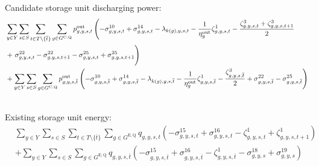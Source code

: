 \documentclass{article}
\newcommand{\sStorageExisting}{G^{\mathrm{E,Q}}}
\newcommand{\sStorageCandidate}{G^{\mathrm{C,Q}}}
\newcommand{\sYears}{Y}
\newcommand{\sScenarios}{S}
\newcommand{\sIntervals}{T}
\newcommand{\iGenerator}{g}
\newcommand{\iYear}{y}
\newcommand{\iScenario}{s}
\newcommand{\iInterval}{t}
\newcommand{\iIntervalTerminal}{\overline{\iInterval}}
\newcommand{\iZone}{z}
\newcommand{\cStorageUnitEfficiencyDischarging}{\eta_{\iGenerator}^{\mathrm{out}}}
\newcommand{\vPowerOut}[1][\iGenerator,\iYear,\iScenario,\iInterval]{p^{\mathrm{out}}_{#1}}
\newcommand{\vStorageUnitEnergy}[1][\iGenerator,\iYear,\iScenario,\iInterval]{q_{#1}}
\newcommand{\dNonNegativeDischarging}[1][\iGenerator,\iYear,\iScenario,\iInterval]{\sigma_{#1}^{10}}
\newcommand{\dMaxDischargingRateCandidate}[1][\iGenerator,\iYear,\iScenario,\iInterval]{\sigma_{#1}^{14}}
\newcommand{\dNonNegativeStorageEnergy}[1][\iGenerator,\iYear,\iScenario,\iInterval]{\sigma_{#1}^{15}}
\newcommand{\dMaxStorageEnergyExisting}[1][\iGenerator,\iYear,\iScenario,\iInterval]{\sigma_{#1}^{16}}
\newcommand{\dMinStorageEnergyIntervalEnd}[1][\iGenerator,\iYear,\iScenario]{\sigma_{#1}^{18}}
\newcommand{\dMaxStorageEnergyIntervalEnd}[1][\iGenerator,\iYear,\iScenario]{\sigma_{#1}^{19}}
\newcommand{\dRampRateUpStorageDischarging}[1][\iGenerator,\iYear,\iScenario,\iInterval]{\sigma_{#1}^{22}}
\newcommand{\dRampRateDownStorageDischarging}[1][\iGenerator,\iYear,\iScenario,\iInterval]{\sigma_{#1}^{25}}
\newcommand{\dPowerBalance}[1][\iZone,\iYear,\iScenario,\iInterval]{\lambda_{#1}}
\newcommand{\dStorageEnergyTransition}[1][\iGenerator,\iYear,\iScenario,\iInterval]{\zeta_{#1}^{1}}
\newcommand{\dStorageEnergyOutput}[1][\iGenerator,\iYear,\iScenario,\iInterval]{\zeta_{#1}^{3}}
\begin{document}
Candidate storage unit discharging power:
\begin{align}
	& \sum\limits_{\iYear \in \sYears}\sum\limits_{\iScenario \in \sScenarios} \sum\limits_{\iInterval \in \sIntervals \setminus \{\iIntervalTerminal\}} \sum\limits_{\iGenerator \in \sStorageCandidate} \vPowerOut \left( - \dNonNegativeDischarging + \dMaxDischargingRateCandidate - \dPowerBalance[k(\iGenerator),\iYear,\iScenario,\iInterval] - \frac{1}{\cStorageUnitEfficiencyDischarging} \dStorageEnergyTransition - \frac{\dStorageEnergyOutput + \dStorageEnergyOutput[\iGenerator,\iYear,\iScenario,\iInterval+1]}{2}\right. \nonumber\\
	& + \left. \vphantom{\sum\limits_{}} \dRampRateUpStorageDischarging - \dRampRateUpStorageDischarging[\iGenerator,\iYear,\iScenario,\iInterval+1] - \dRampRateDownStorageDischarging + \dRampRateDownStorageDischarging[\iGenerator,\iYear,\iScenario,\iInterval+1] \right) \\
	& + \sum\limits_{\iYear \in \sYears}\sum\limits_{\iScenario \in \sScenarios} \sum\limits_{\iGenerator \in \sStorageCandidate} \vPowerOut[\iGenerator,\iYear,\iScenario,\iIntervalTerminal] \left( - \dNonNegativeDischarging[\iGenerator,\iYear,\iScenario,\iIntervalTerminal] + \dMaxDischargingRateCandidate[\iGenerator,\iYear,\iScenario,\iIntervalTerminal] - \dPowerBalance[k(\iGenerator),\iYear,\iScenario,\iIntervalTerminal] - \frac{1}{\cStorageUnitEfficiencyDischarging} \dStorageEnergyTransition[\iGenerator,\iYear,\iScenario,\iIntervalTerminal] - \frac{\dStorageEnergyOutput[\iGenerator,\iYear,\iScenario,\iIntervalTerminal]}{2} + \dRampRateUpStorageDischarging[\iGenerator,\iYear,\iScenario,\iIntervalTerminal] - \dRampRateDownStorageDischarging[\iGenerator,\iYear,\iScenario,\iIntervalTerminal] \right)\\\nonumber
\end{align}

Existing storage unit energy:
\begin{align}
	& \sum\limits_{\iYear \in \sYears}\sum\limits_{\iScenario \in \sScenarios} \sum\limits_{\iInterval \in \sIntervals \setminus \{\iIntervalTerminal\}} \sum\limits_{\iGenerator \in \sStorageExisting} \vStorageUnitEnergy \left(- \dNonNegativeStorageEnergy + \dMaxStorageEnergyExisting - \dStorageEnergyTransition + \dStorageEnergyTransition[\iGenerator,\iYear,\iScenario,\iInterval+1] \right)\\
	& + \sum\limits_{\iYear \in \sYears}\sum\limits_{\iScenario \in \sScenarios}\sum\limits_{\iGenerator \in \sStorageExisting} \vStorageUnitEnergy[\iGenerator,\iYear,\iScenario,\iIntervalTerminal] \left(- \dNonNegativeStorageEnergy[\iGenerator,\iYear,\iScenario,\iIntervalTerminal] + \dMaxStorageEnergyExisting[\iGenerator,\iYear,\iScenario,\iIntervalTerminal] - \dStorageEnergyTransition[\iGenerator,\iYear,\iScenario,\iIntervalTerminal] - \dMinStorageEnergyIntervalEnd + \dMaxStorageEnergyIntervalEnd \right)\\
\end{align}
\end{document}
